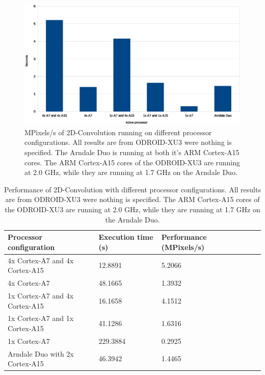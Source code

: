 \begin{figure}[H]
  \centering
  \includegraphics[width=160mm]{fig/mpixelss-configurations.eps}
  \caption{MPixels/s of 2D-Convolution running on different processor configurations. All results are from ODROID-XU3 were nothing is specified. The Arndale Duo is running at both it's ARM Cortex-A15 cores. The ARM Cortex-A15 cores of the ODROID-XU3 are running at 2.0 GHz, while they are running at 1.7 GHz on the Arndale Duo. \label{overflow}}
\end{figure}

\begin{table}[H]
  \begin{tabular}{llllll}
    \toprule
    Processor configuration           & Execution time (s)  & Performance (MPixels/s) \\
    \midrule
    4x Cortex-A7 and 4x Cortex-A15    & 12.8891             & 5.2066\\
    4x Cortex-A7                      & 48.1665             & 1.3932\\
    1x Cortex-A7 and 4x Cortex-A15    & 16.1658             & 4.1512\\
    1x Cortex-A7 and 1x Cortex-A15    & 41.1286             & 1.6316\\
    1x Cortex-A7                      & 229.3884            & 0.2925\\
    Arndale Duo with 2x Cortex-A15    & 46.3942             & 1.4465\\
    \bottomrule
  \end{tabular}
  \caption{Performance of 2D-Convolution with different processor configurations. All results are from ODROID-XU3 were nothing is specified. The ARM Cortex-A15 cores of the ODROID-XU3 are running at 2.0 GHz, while they are running at 1.7 GHz on the Arndale Duo. \label{overflow}}
\end{table}

